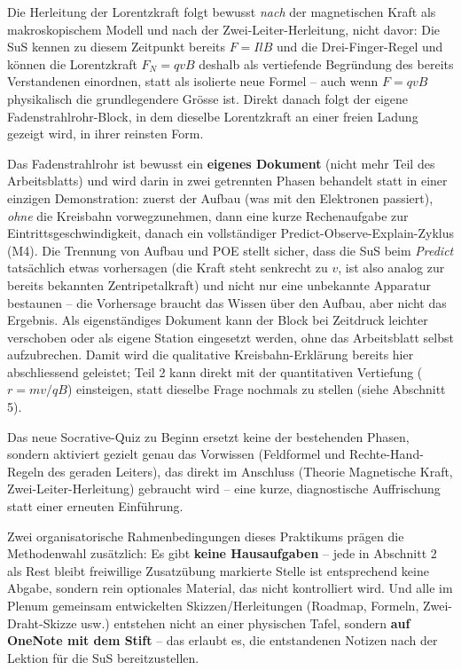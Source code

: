 \documentclass[11pt,a4paper]{article}
\begin{document}
Die Herleitung der Lorentzkraft folgt bewusst \emph{nach} der magnetischen
Kraft als makroskopischem Modell und nach der Zwei-Leiter-Herleitung,
nicht davor: Die SuS kennen zu diesem Zeitpunkt bereits $F=IlB$ und die
Drei-Finger-Regel und können die Lorentzkraft $F_N=qvB$ deshalb als
vertiefende Begründung des bereits Verstandenen einordnen, statt als
isolierte neue Formel -- auch wenn $F=qvB$ physikalisch die
grundlegendere Grösse ist. Direkt danach folgt der eigene
Fadenstrahlrohr-Block, in dem dieselbe Lorentzkraft an einer freien
Ladung gezeigt wird, in ihrer reinsten Form.

Das Fadenstrahlrohr ist bewusst ein \textbf{eigenes Dokument} (nicht mehr
Teil des Arbeitsblatts) und wird darin in zwei getrennten Phasen
behandelt statt in einer einzigen Demonstration: zuerst der Aufbau (was
mit den Elektronen passiert), \emph{ohne} die Kreisbahn vorwegzunehmen,
dann eine kurze Rechenaufgabe zur Eintrittsgeschwindigkeit, danach ein
vollständiger Predict-Observe-Explain-Zyklus (M4). Die Trennung von
Aufbau und POE stellt sicher, dass die SuS beim \emph{Predict}
tatsächlich etwas vorhersagen (die Kraft steht senkrecht zu $v$, ist also
analog zur bereits bekannten Zentripetalkraft) und nicht nur eine
unbekannte Apparatur bestaunen -- die Vorhersage braucht das Wissen über
den Aufbau, aber nicht das Ergebnis. Als eigenständiges Dokument kann der
Block bei Zeitdruck leichter verschoben oder als eigene Station
eingesetzt werden, ohne das Arbeitsblatt selbst aufzubrechen. Damit wird
die qualitative Kreisbahn-Erklärung bereits hier abschliessend geleistet;
Teil 2 kann direkt mit der quantitativen Vertiefung ($r=mv/qB$)
einsteigen, statt dieselbe Frage nochmals zu stellen (siehe Abschnitt 5).

Das neue Socrative-Quiz zu Beginn ersetzt keine der bestehenden Phasen,
sondern aktiviert gezielt genau das Vorwissen (Feldformel und
Rechte-Hand-Regeln des geraden Leiters), das direkt im Anschluss (Theorie
Magnetische Kraft, Zwei-Leiter-Herleitung) gebraucht wird -- eine kurze,
diagnostische Auffrischung statt einer erneuten Einführung.

Zwei organisatorische Rahmenbedingungen dieses Praktikums prägen die
Methodenwahl zusätzlich: Es gibt \textbf{keine Hausaufgaben} -- jede in
Abschnitt 2 als \glqq Rest bleibt freiwillige Zusatzübung\grqq{}
markierte Stelle ist entsprechend keine Abgabe, sondern rein optionales
Material, das nicht kontrolliert wird. Und alle im Plenum gemeinsam
entwickelten Skizzen/Herleitungen (Roadmap, Formeln, Zwei-Draht-Skizze
usw.) entstehen nicht an einer physischen Tafel, sondern \textbf{auf
OneNote mit dem Stift} -- das erlaubt es, die entstandenen Notizen nach
der Lektion für die SuS bereitzustellen.
\end{document}
